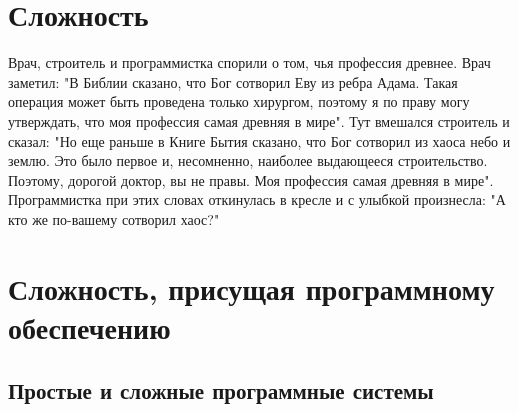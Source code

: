 \documentclass[11pt]{article}
\begin{document}
\begin{center}
		\bf\section*{Сложность}
\end{center}

\hangindent=8cm\noindent
\begin{small}
Врач, строитель и программистка спорили о том, чья профессия древнее. Врач заметил: "В Библии сказано, что Бог сотворил Еву из ребра Адама. Такая операция может быть проведена только хирургом, поэтому я по праву могу утверждать, что моя профессия самая древняя в мире". Тут вмешался строитель и сказал: "Но еще раньше в Книге Бытия сказано, что Бог сотворил из хаоса небо и землю. Это было первое и, несомненно, наиболее выдающееся строительство. Поэтому, дорогой доктор, вы не правы. Моя профессия самая древняя в мире". Программистка при этих словах откинулась в кресле и с улыбкой произнесла: "А кто же по-вашему сотворил хаос?"\\
\end{small}
\noindent

\section{Сложность, присущая программному обеспечению }

\subsection{Простые и сложные программные системы }
\
\end{document}
